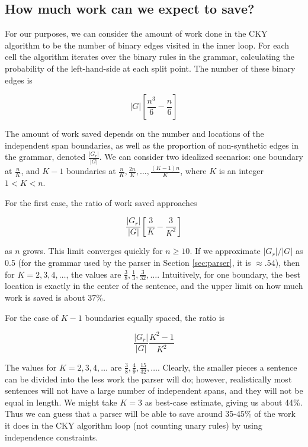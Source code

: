 \documentclass[11pt]{article}
\begin{document}
\subsection{How much work can we expect to save?}
\label{sec-3-1}

For our purposes, we can consider the amount of work done in the CKY algorithm
to be the number of binary edges visited in the inner loop. For each cell
the algorithm iterates over the binary rules in the grammar, calculating the
probability of the left-hand-side at each split point. The number of these
binary edges is

\begin{equation*}
|G|\left[\frac{n^3}{6} - \frac{n}{6}\right]
\end{equation*}

The amount of work saved depends on the number and locations of the
independent span boundaries, as well as the proportion of
non-synthetic edges in the grammar, denoted $\frac{|G_r|}{|G|}$. We
can consider two idealized scenarios: one boundary at $\frac{n}{K}$,
and $K-1$ boundaries at $\frac{n}{K}, \frac{2n}{K}, \dots,
\frac{(K-1)n}{K}$, where $K$ is an integer $1 < K < n$.

For the first case, the ratio of work saved approaches

\begin{equation*}
\frac{|G_r|}{|G|} \left[ \frac{3}{K} - \frac{3}{K^2} \right]
\end{equation*}

as $n$ grows. This limit converges quickly for $n \ge 10$. If we
approximate $|G_r|/|G|$ as 0.5 (for the grammar used by the parser in
Section \ref{sec:parser}, it is $\approx .54$), then for
$K=2,3,4,\dots$, the values are $\frac{3}{8}, \frac{1}{3},
\frac{3}{32}, \dots$. Intuitively, for one boundary, the best location
is exactly in the center of the sentence, and the upper limit on how
much work is saved is about 37\%.

For the case of $K-1$ boundaries equally spaced, the ratio is

\begin{equation*}
\frac{|G_r|}{|G|}\frac{K^2 - 1}{K^2}
\end{equation*}

The values for $K=2,3,4,\dots$ are $\frac{3}{8}, \frac{4}{9},
\frac{15}{32}, \dots$. Clearly, the smaller pieces a sentence can be
divided into the less work the parser will do; however, realistically
most sentences will not have a large number of independent spans, and
they will not be equal in length. We might take $K=3$ as best-case
estimate, giving us about 44\%. Thus we can guess that a parser will be
able to save around 35-45\% of the work it does in the CKY algorithm
loop (not counting unary rules) by using independence constraints.
\end{document}
